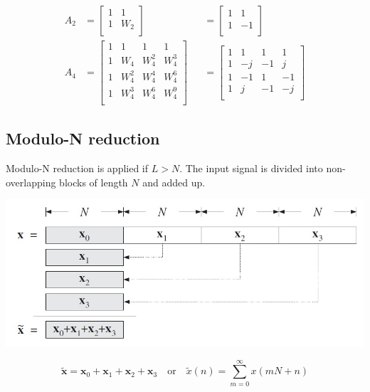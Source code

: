 \begin{align*}
	A_2 &=
		\begin{bmatrix}
			1& 1 \\
			1& W_2 \\
		\end{bmatrix}
		&&=
		\begin{bmatrix}
			1& 1 \\
			1& -1 \\
		\end{bmatrix}	 \\
	A_4 &=
		\begin{bmatrix}
			1& 1& 1& 1 \\
			1& W_4& W_4^2& W_4^3 \\
			1& W_4^2& W_4^4& W_4^6 \\
			1& W_4^3& W_4^6& W_4^9 \\
		\end{bmatrix}
		&&=
		\begin{bmatrix}
			1& 1& 1& 1 \\
			1& -j& -1& j \\
			1& -1& 1& -1 \\
			1& j& -1& -j \\
		\end{bmatrix}
\end{align*}

\subsection{Modulo-N reduction}
Modulo-N reduction is applied if $L>N$.  The input signal is divided into
non-overlapping blocks of length $N$ and added up.

\begin{center}
	\includegraphics[width=0.8\linewidth]{images/DFT_FFT_ModuloN.jpg}
\end{center}

\begin{equation*}
	\tilde{\mathbf{x}} = \mathbf{x}_0 + \mathbf{x}_1 + \mathbf{x}_2 + \mathbf{x}_3
		\quad \text{or} \quad
	\tilde{x}(n) = \sum\limits_{m=0}^{\infty} x(mN + n)
\end{equation*}

